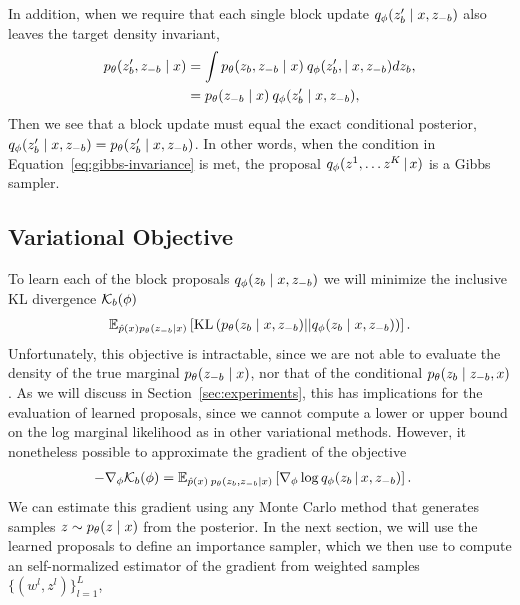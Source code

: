 \documentclass{article}
\theoremstyle{definition}
\begin{document}
In addition, when we require that each single block update $q_\phi(z'_b \mid x, z_{-b})$ also leaves the target density invariant,
\begin{align}
    \label{eq:gibbs-invariance}
    p_\theta(z'_b, z_{-b} \mid x)
    &= 
    \int 
    p_\theta(z_b, z_{-b} \mid x) \:
    q_\phi(z'_b, \mid x, z_{-b}) 
    dz_{b},
    \\
    &= 
    p_\theta(z_{-b} \mid x) \:
    q_\phi(z'_b \mid x, z_{-b})
    , \nonumber
\end{align}
Then we see that a block update must equal the exact conditional posterior, $q_\phi(z'_b \mid x, z_{-b}) = p_\theta(z'_b \mid x, z_{-b})$.
In other words, when the condition in Equation~\ref{eq:gibbs-invariance} is met, the proposal $q_\phi(z^1, \ldots z^K \,|\, x)$ is a Gibbs sampler.


\subsection{Variational Objective} 
To learn each of the block proposals $q_\phi(z_b \mid x, z_{-b})$ we will minimize the inclusive KL divergence $\mathcal{K}_b(\phi)$
\begin{align}
    \mathbb{E}_{\hat{p}(x)p_\theta(z_{-b} | x)}
    \left[
    \text{KL}\left(
        p_\theta(z_{b} \mid x, z_{-b})
        ||
        q_\phi(z_{b} \mid x, z_{-b})
    \right)
    \right]. \label{eq:variational_objective}
\end{align}
Unfortunately, this objective is intractable, since we are not able to evaluate the density of the true marginal $p_\theta(z_{-b} \mid x)$, nor that of the conditional $p_\theta(z_{b} \mid z_{-b}, x)$. 
As we will discuss in Section~\ref{sec:experiments}, this has implications for the evaluation of learned proposals, since we cannot compute a lower or upper bound on the log marginal likelihood as in other variational methods. However, it nonetheless possible to approximate the gradient of the objective 
\begin{align*}
    -\nabla_\phi \mathcal{K}_b(\phi)
    &=
    \mathbb{E}_{
    \hat{p}(x) \:
    p_\theta(z_{b}, z_{-b} | x)
    }
    \left[
    \nabla_\phi
    \log q_\phi(z_{b} \,|\, x, z_{-b})
    \right].
\end{align*}
We can estimate this gradient using any Monte Carlo method that generates samples $z \sim p_\theta(z \mid x)$ from the posterior. In the next section, we will use the learned proposals to define an importance sampler, which we then use to compute an self-normalized estimator of the gradient from weighted samples $\{(w^l, z^l)\}_{l=1}^L$, 
\end{document}
